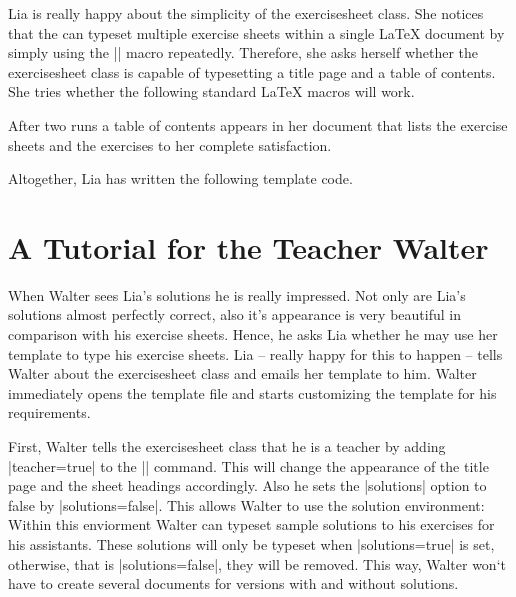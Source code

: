 \documentclass[a4paper,fleqn]{report}
\def\exercisesheet{{exercisesheet}}
\begin{document}


\noindent Lia is really happy about the simplicity of the
\exercisesheet{} class. She notices that the can typeset multiple
exercise sheets within a single \LaTeX{} document by simply using the
|\sheet| macro repeatedly. Therefore, she asks herself whether the
\exercisesheet{} class is capable of typesetting a title page and a
table of contents. She tries whether the following standard \LaTeX{}
macros will work.



\noindent After two runs a table of contents appears in her document
that lists the exercise sheets and the exercises to her complete
satisfaction. 

\noindent Altogether, Lia has written the following template code.




\section{A Tutorial for the Teacher Walter}

When Walter sees Lia's solutions he is really impressed. Not only are
Lia's solutions almost perfectly correct, also it's appearance is very
beautiful in comparison with his exercise sheets. Hence, he asks Lia
whether he may use her template to type his exercise sheets. Lia --
really happy for this to happen -- tells Walter about the
\exercisesheet{} class and emails her template to him. Walter
immediately opens the template file and starts customizing the
template for his requirements.

First, Walter tells the \exercisesheet{} class that he is a teacher by
adding |teacher=true| to the |\sheetconf| command. This will change
the appearance of the title page and the sheet headings accordingly.
Also he sets the |solutions| option to false by |solutions=false|.
This allows Walter to use the solution environment: Within this
enviorment Walter can typeset sample solutions to his exercises for
his assistants. These solutions will only be typeset when
|solutions=true| is set, otherwise, that is |solutions=false|, they
will be removed. This way, Walter won‘t have to create several
documents for versions with and without solutions.


\end{document}
